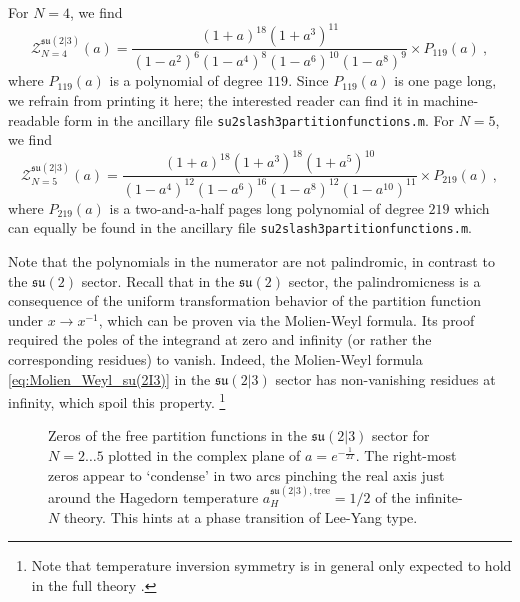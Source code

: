\documentclass[a4paper,11pt]{article}
\begin{document}
For $N=4$, we find
\begin{equation}
	\mathcal{Z}_{N=4}^{\mathfrak{su}(2|3)}(a) = \frac{(1+a)^{18}(1+a^3)^{11}}{(1-a^2)^6(1-a^4)^8(1-a^6)^{10}(1-a^8)^9} \times P_{119}(a) \ ,
\end{equation}
where $P_{119}(a)$ is a polynomial of degree $119$. Since $P_{119}(a)$ is one page long, we refrain from printing it here; the interested reader can find it in machine-readable form in the ancillary file \texttt{su2slash3partitionfunctions.m}.
% 
For $N=5$, we find
\begin{equation}
	\mathcal{Z}_{N=5}^{\mathfrak{su}(2|3)}(a) = \frac{(1+a)^{18}(1+a^3)^{18}(1+a^5)^{10}}{(1-a^4)^{12}(1-a^6)^{16}(1-a^8)^{12}(1-a^{10})^{11}} \times P_{219}(a) \ ,
\end{equation}
where $P_{219}(a)$ is a two-and-a-half pages long polynomial of degree $219$ which can equally be found in the ancillary file \texttt{su2slash3partitionfunctions.m}. 

Note that the polynomials in the numerator are not palindromic, in contrast to the $\mathfrak{su}(2)$ sector.
Recall that in the $\mathfrak{su}(2)$ sector, the palindromicness is a consequence of the uniform transformation behavior of the partition function under $x\to x^{-1}$, which can be proven via the Molien-Weyl formula. Its proof required the poles of the integrand at zero and infinity (or rather the corresponding residues) to vanish. Indeed, the Molien-Weyl formula \eqref{eq:Molien_Weyl_su(2I3)} in the  $\mathfrak{su}(2|3)$ sector has non-vanishing residues at infinity, which spoil this property.%
\footnote{Note that temperature inversion symmetry is in general only expected to hold in the full theory \cite{McGady:2017rzv}.}


\begin{figure}[t]
\begin{center}
	\caption{Zeros of the free partition functions in the $\mathfrak{su}(2|3)$ sector for $N=2\dotsc 5$ plotted in the complex plane of $a=e^{-\frac{1}{2T}}$. The right-most zeros appear to `condense' in two arcs pinching the real axis just around the Hagedorn temperature $a_H^{\mathfrak{su}(2|3),\text{tree}}=1/2$ of the infinite-$N$ theory. This hints at a phase transition of Lee-Yang type.}
	\label{fig:su(2I3)_zeros}
\end{center}
\end{figure}
\end{document}
